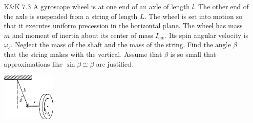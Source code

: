 \documentclass{esg8012pset}
\begin{document}
\begin{problem}{K\&K 7.3}
  A gyroscope wheel is at one end of an axle of length $l$. The other end of the axle is suspended from a string of length $L$. The wheel is set into motion so that it executes uniform precession in the horizontal plane. The wheel has mass $m$ and moment of inertia about its center of mass $I_\text{cm}$. Its spin angular velocity is $\omega_s$. Neglect the mass of the shaft and the mass of the string. Find the angle $\beta$ that the string makes with the vertical. Assume that $\beta$ is so small that approximations like $\sin\beta \cong \beta$ are justified.
  \begin{center}\includegraphics[width=0.2\textwidth]{ps11_2}\end{center}
\end{problem}
\end{document}
